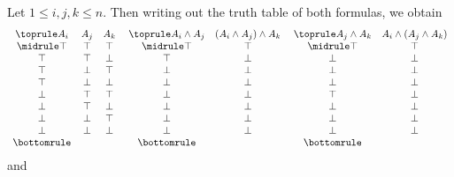 \begin{myproof}
    Let \(1\le i,j,k\le n\).
    Then writing out the truth table of both formulas,
    we obtain
    \[
        \begin{array}{c c c} \toprule
            A_i & A_j & A_k \\ \midrule
            \top & \top & \top \\
            \top & \top & \bot \\
            \top & \bot & \top \\
            \top & \bot & \bot \\
            \bot & \top & \top \\
            \bot & \top & \bot \\
            \bot & \bot & \top \\
            \bot & \bot & \bot \\ \bottomrule
        \end{array}
        \;
        \begin{array}{c c} \toprule
            A_i\wedge A_j & (A_i\wedge A_j)\wedge A_k \\ \midrule
            \top & \top \\
            \top & \bot \\
            \bot & \bot \\
            \bot & \bot \\
            \bot & \bot \\
            \bot & \bot \\
            \bot & \bot \\
            \bot & \bot \\ \bottomrule
        \end{array}
        \;
        \begin{array}{c c} \toprule
            A_j\wedge A_k & A_i\wedge (A_j\wedge A_k) \\ \midrule
            \top & \top \\
            \bot & \bot \\
            \bot & \bot \\
            \bot & \bot \\
            \top & \bot \\
            \bot & \bot \\
            \bot & \bot \\
            \bot & \bot \\ \bottomrule
        \end{array}
    \]
    and

\end{myproof}
